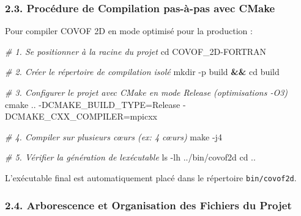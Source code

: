 \documentclass[
  french,
]{article}
\newenvironment{Shaded}{}{}
\newcommand{\AttributeTok}[1]{\textcolor[rgb]{0.49,0.56,0.16}{#1}}
\newcommand{\BuiltInTok}[1]{\textcolor[rgb]{0.00,0.50,0.00}{#1}}
\newcommand{\CommentTok}[1]{\textcolor[rgb]{0.38,0.63,0.69}{\textit{#1}}}
\newcommand{\FunctionTok}[1]{\textcolor[rgb]{0.02,0.16,0.49}{#1}}
\newcommand{\KeywordTok}[1]{\textcolor[rgb]{0.00,0.44,0.13}{\textbf{#1}}}
\newcommand{\NormalTok}[1]{#1}
\newcommand{\OperatorTok}[1]{\textcolor[rgb]{0.40,0.40,0.40}{#1}}
\begin{document}
\subsubsection{2.3. Procédure de Compilation pas-à-pas avec
CMake}\label{procuxe9dure-de-compilation-pas-uxe0-pas-avec-cmake}

Pour compiler COVOF 2D en mode optimisé pour la production :

\begin{Shaded}
\begin{Highlighting}[]
\CommentTok{\# 1. Se positionner à la racine du projet}
\BuiltInTok{cd}\NormalTok{ COVOF\_2D{-}FORTRAN}

\CommentTok{\# 2. Créer le répertoire de compilation isolé}
\FunctionTok{mkdir} \AttributeTok{{-}p}\NormalTok{ build }\KeywordTok{\&\&} \BuiltInTok{cd}\NormalTok{ build}

\CommentTok{\# 3. Configurer le projet avec CMake en mode Release (optimisations {-}O3)}
\FunctionTok{cmake}\NormalTok{ .. }\AttributeTok{{-}DCMAKE\_BUILD\_TYPE}\OperatorTok{=}\NormalTok{Release }\AttributeTok{{-}DCMAKE\_CXX\_COMPILER}\OperatorTok{=}\NormalTok{mpicxx}

\CommentTok{\# 4. Compiler sur plusieurs cœurs (ex: 4 cœurs)}
\FunctionTok{make} \AttributeTok{{-}j4}

\CommentTok{\# 5. Vérifier la génération de l\textquotesingle{}exécutable}
\FunctionTok{ls} \AttributeTok{{-}lh}\NormalTok{ ../bin/covof2d}
\BuiltInTok{cd}\NormalTok{ ..}
\end{Highlighting}
\end{Shaded}

L'exécutable final est automatiquement placé dans le répertoire
\texttt{bin/covof2d}.

\subsubsection{2.4. Arborescence et Organisation des Fichiers du
Projet}\label{arborescence-et-organisation-des-fichiers-du-projet}
\end{document}
